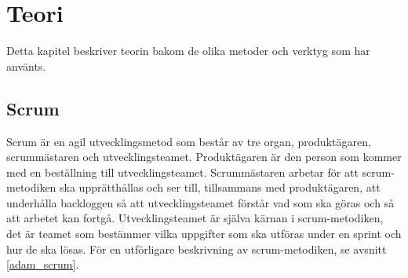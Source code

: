 \chapter{Teori}
Detta kapitel beskriver teorin bakom de olika metoder och verktyg som har använts.

\section{Scrum}
Scrum är en agil utvecklingsmetod som består av tre organ, produktägaren, scrummästaren och utvecklingsteamet. Produktägaren är den person som kommer med en beställning till utvecklingsteamet. Scrummästaren arbetar för att scrum-metodiken ska upprätthållas och ser till, tillsammans med produktägaren, att underhålla backloggen så att utvecklingsteamet förstår vad som ska göras och så att arbetet kan fortgå. Utvecklingsteamet är själva kärnan i scrum-metodiken, det är teamet som bestämmer vilka uppgifter som ska utföras under en sprint och hur de ska lösas. För en utförligare beskrivning av scrum-metodiken, se avsnitt \ref{adam_scrum}.